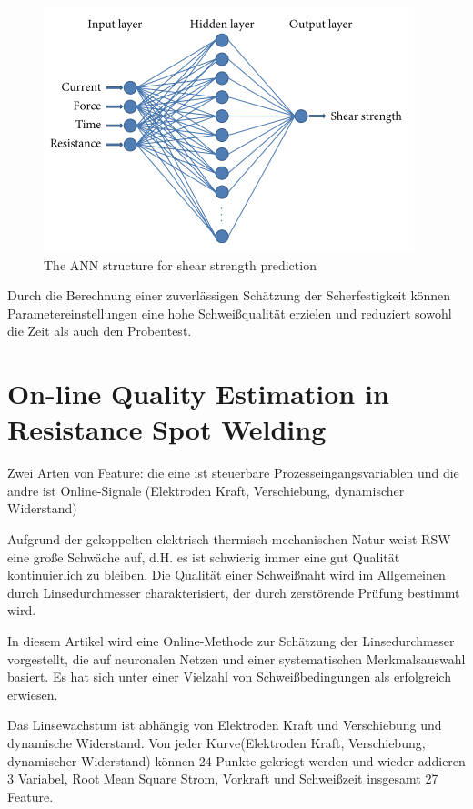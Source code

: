 \documentclass[english,ngerman]{tudscrreprt}
\begin{document}
\begin{figure}[H]
\centering
\includegraphics{./Bilder/The ANN structure for shear strength prediction.png}
\caption{The ANN structure for shear strength prediction}\label{fgg:ANN}
\end{figure}
Durch die Berechnung einer zuverlässigen Schätzung der Scherfestigkeit können Parametereinstellungen eine hohe Schweißqualität erzielen und reduziert sowohl die Zeit als auch den Probentest.
\newpage

\section{On-line Quality Estimation in Resistance Spot Welding\cite{Li.2000}}
Zwei Arten von Feature: die eine ist steuerbare Prozesseingangsvariablen und die andre ist Online-Signale (Elektroden Kraft, Verschiebung, dynamischer Widerstand)

Aufgrund der gekoppelten elektrisch-thermisch-mechanischen Natur weist RSW eine große Schwäche auf, d.H. es ist schwierig immer eine gut Qualität kontinuierlich zu bleiben. Die Qualität einer Schweißnaht wird im Allgemeinen durch Linsedurchmesser charakterisiert, der durch zerstörende Prüfung bestimmt wird.

In diesem Artikel wird eine Online-Methode zur Schätzung der Linsedurchmsser vorgestellt, die auf neuronalen Netzen und einer systematischen Merkmalsauswahl basiert. Es hat sich unter einer Vielzahl von Schweißbedingungen als erfolgreich erwiesen.

Das Linsewachstum ist abhängig von Elektroden Kraft und Verschiebung und dynamische Widerstand. Von jeder Kurve(Elektroden Kraft, Verschiebung, dynamischer Widerstand) können 24 Punkte gekriegt werden und wieder addieren 3 Variabel, Root Mean Square Strom, Vorkraft und Schweißzeit insgesamt 27 Feature.
\end{document}
